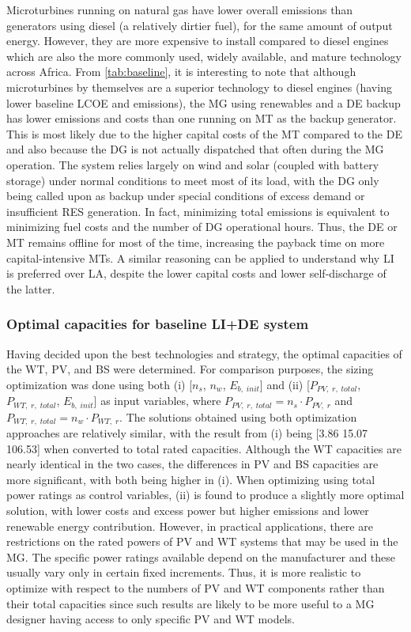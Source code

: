 \documentclass[final,3p,times]{elsarticle}
\begin{document}
Microturbines running on natural gas have lower overall emissions than generators using diesel (a relatively dirtier fuel), for the same amount of output energy. However, they are more expensive to install compared to diesel engines which are also the more commonly used, widely available, and mature technology across Africa. From \cref{tab:baseline}, it is interesting to note that although microturbines by themselves are a superior technology to diesel engines (having lower baseline LCOE and emissions), the MG using renewables and a DE backup has lower emissions and costs than one running on MT as the backup generator. This is most likely due to the higher capital costs of the MT compared to the DE and also because the DG is not actually dispatched that often during the MG operation. The system relies largely on wind and solar (coupled with battery storage) under normal conditions to meet most of its load, with the DG only being called upon as backup under special conditions of excess demand or insufficient RES generation. In fact, minimizing total emissions is equivalent to minimizing fuel costs and the number of DG operational hours. Thus, the DE or MT remains offline for most of the time, increasing the payback time on more capital-intensive MTs. A similar reasoning can be applied to understand why LI is preferred over LA, despite the lower capital costs and lower self-discharge of the latter. 

\subsubsection{Optimal capacities for baseline LI+DE system}

Having decided upon the best technologies and strategy, the optimal capacities of the WT, PV, and BS were determined. For comparison purposes, the sizing optimization was done using both (i) [$n_s$, $n_w$, $E_{b,\; init}$] and (ii) [$P_{PV,\;r,\;total}$, $P_{WT,\;r,\;total}$, $E_{b,\; init}$] as input variables, where $P_{PV,\;r,\;total} = n_s \cdot P_{PV,\;r}$ and $P_{WT,\;r,\;total} = n_w \cdot P_{WT,\;r}$. The solutions obtained using both optimization approaches are relatively similar, with the result from (i) being [3.86 15.07 106.53] when converted to total rated capacities. Although the WT capacities are nearly identical in the two cases, the differences in PV and BS capacities are more significant, with both being higher in (i). When optimizing using total power ratings as control variables, (ii) is found to produce a slightly more optimal solution, with lower costs and excess power but higher emissions and lower renewable energy contribution. However, in practical applications, there are restrictions on the rated powers of PV and WT systems that may be used in the MG. The specific power ratings available depend on the manufacturer and these usually vary only in certain fixed increments. Thus, it is more realistic to optimize with respect to the numbers of PV and WT components rather than their total capacities since such results are likely to be more useful to a MG designer having access to only specific PV and WT models. 
\end{document}
